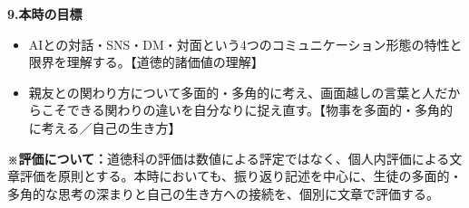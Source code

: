 \documentclass[uplatex,a4paper,11pt]{jsarticle}
\newcommand{\itemhead}[2]{\par\medskip\noindent\textbf{#1.\quad #2}\par\nopagebreak\smallskip}
\begin{document}
\itemhead{9}{本時の目標}
\begin{itemize}[label={○},leftmargin=2.2em,itemsep=3pt,topsep=2pt]
  \item AIとの対話・SNS・DM・対面という4つのコミュニケーション形態の特性と限界を理解する。【道徳的諸価値の理解】
  \item 親友との関わり方について多面的・多角的に考え、画面越しの言葉と人だからこそできる関わりの違いを自分なりに捉え直す。【物事を多面的・多角的に考える／自己の生き方】
\end{itemize}

\hspace{1zw}\textbf{※評価について：}道徳科の評価は数値による評定ではなく、個人内評価による文章評価を原則とする。本時においても、振り返り記述を中心に、生徒の多面的・多角的な思考の深まりと自己の生き方への接続を、個別に文章で評価する。\par
\end{document}
